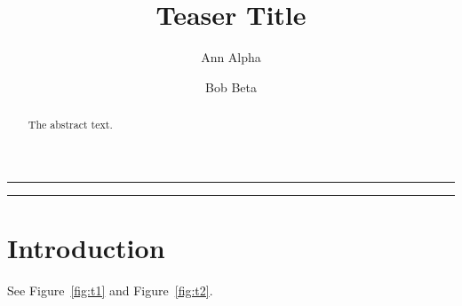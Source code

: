 \documentclass[sigconf,nonacm]{acmart}
\begin{document}
\title{Teaser Title}
\author{Ann Alpha}
\author{Bob Beta}
\begin{abstract}
The abstract text.
\end{abstract}
\begin{teaserfigure}
\centering\rule{2cm}{1cm}
\caption{First teaser}\label{fig:t1}
\end{teaserfigure}
\begin{teaserfigure}
\centering\rule{2cm}{1cm}
\caption{Second teaser}\label{fig:t2}
\end{teaserfigure}
\maketitle
\section{Introduction}
See Figure~\ref{fig:t1} and Figure~\ref{fig:t2}.
\end{document}

